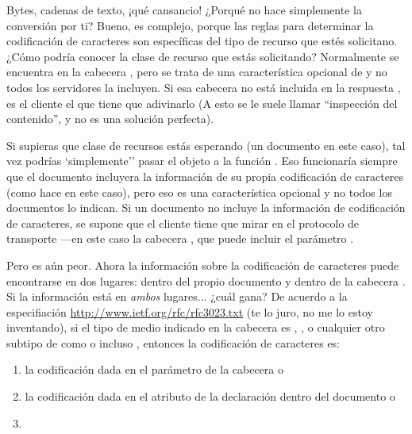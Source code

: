 Bytes, cadenas de texto, ¡qué cansancio! ¿Porqué  no hace simplemente la conversión por ti? Bueno, es complejo, porque las reglas para determinar la codificación de caracteres son específicas del tipo de recurso que estés solicitano. ¿Cómo podría  conocer la clase de recurso que estás solicitando? Normalmente se encuentra en la cabecera , pero se trata de una característica opcional de  y no todos los servidores  la incluyen. Si esa cabecera no está incluida en la respuesta , es el cliente el que tiene que adivinarlo (A esto se le suele llamar ``inspección del contenido'', y no es una solución perfecta).

Si supieras que clase de recursos estás esperando (un documento  en este caso), tal vez podrías `simplemente'' pasar el objeto  a la función . Eso funcionaría siempre que el documento  incluyera la información de su propia codificación de caracteres (como hace en este caso), pero eso es una característica opcional y no todos los documentos  lo indican. Si un documento  no incluye la información de codificación de caracteres, se supone que el cliente tiene que mirar en el protocolo de transporte ---en este caso la cabecera , que puede incluir el parámetro .

Pero es aún peor. Ahora la información sobre la codificación de caracteres puede encontrarse en dos lugares: dentro del propio documento  y dentro de la cabecera . Si la información está en \emph{ambos} lugares... ¿cuál gana? De acuerdo a la especifiación \href{http://www.ietf.org/rfc/rfc3023.txt}{http://www.ietf.org/rfc/rfc3023.txt} (te lo juro, no me lo estoy inventando), si el tipo de medio indicado en la cabecera  es , ,  o cualquier otro subtipo de  como  o incluso , entonces la codificación de caracteres es:

\begin{enumerate}

\item la codificación dada en el parámetro  de la cabecera  o

\item la codificación dada en el atributo  de la declaración  dentro del documento o

\item {}

\end{enumerate}

